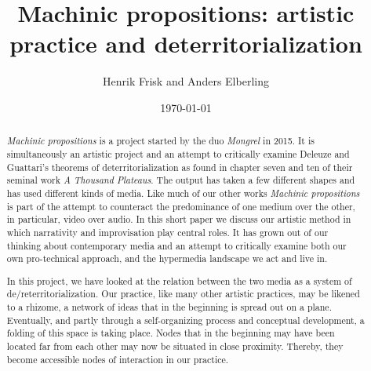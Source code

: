 \documentclass[11pt]{article}
\author{Henrik Frisk and Anders Elberling}
\date{\today}
\title{Machinic propositions: artistic practice and deterritorialization}
\begin{document}
\maketitle

\begin{abstract}
  \emph{Machinic propositions} is a project started by the duo \emph{Mongrel} in
2015. It is simultaneously an artistic project and an attempt to critically examine Deleuze and
Guattari's theorems of deterritorialization as found in chapter seven
and ten of their seminal work \emph{A Thousand Plateaus}. The output has taken a few different shapes and
has used different kinds of media. Like much of our other works \emph{Machinic propositions} is
part of the attempt to counteract the predominance of one medium over
the other, in particular, video over audio. In this short paper we
discuss our artistic method in which narrativity and improvisation play central
roles. It has grown out of our thinking about contemporary media and
an attempt to critically examine both our own pro-technical
approach, and the hypermedia landscape we act and live in.

In this project, we have looked at the
relation between the two media as a system of
de/reterritorialization. Our practice, like many other artistic
practices, may be likened to a rhizome, a network of ideas
that in the beginning is spread out on a plane. Eventually, and partly
through a self-organizing process and conceptual development, a folding of this space is taking place. Nodes that in the beginning may
have been located far from each other may now be situated in
close proximity. Thereby, they become accessible nodes of interaction
in our practice.


\end{abstract}

\end{document}
